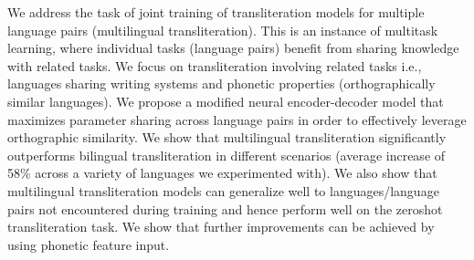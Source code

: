 We address the task of joint training of transliteration models for multiple language pairs (multilingual transliteration). This is an instance of multitask learning, where individual tasks (language pairs) benefit from sharing knowledge with related tasks. We focus on transliteration involving related tasks i.e., languages sharing writing systems and phonetic properties (orthographically similar languages). We propose a modified neural encoder-decoder model that maximizes parameter sharing across language pairs in order to effectively leverage orthographic similarity. We show that multilingual transliteration significantly outperforms bilingual transliteration in different scenarios (average increase of 58\% across a variety of languages we experimented with). We also show that multilingual transliteration models can generalize well to languages/language pairs not encountered during training and hence perform well on the zeroshot transliteration task. We show that further improvements can be achieved by using phonetic feature input.